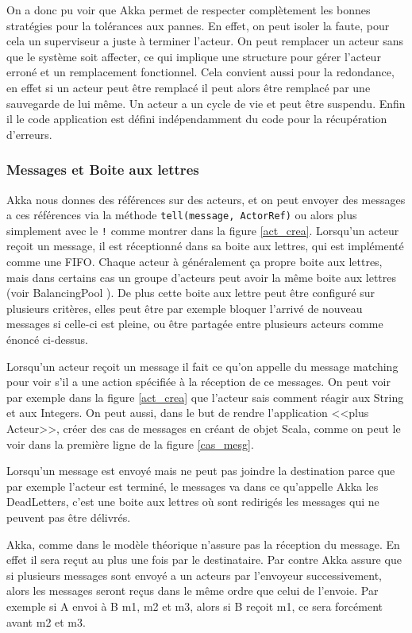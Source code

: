\documentclass[11pt, a4paper]{article}
\begin{document}
\newline
\par 
On a donc pu voir que Akka permet de respecter complètement les bonnes stratégies pour la tolérances aux pannes. En effet, on peut isoler la faute, pour cela un superviseur a juste à terminer l'acteur. On peut remplacer un acteur sans que le système soit affecter, ce qui implique une structure pour gérer l'acteur erroné et un remplacement fonctionnel. Cela convient aussi pour la redondance, en effet si un acteur peut être remplacé il peut alors être remplacé par une sauvegarde de lui même. Un acteur a un cycle de vie et peut être suspendu. Enfin il le code application est défini indépendamment du code pour la récupération d'erreurs.
\subsubsection{Messages et Boite aux lettres}
Akka nous donnes des références sur des acteurs, et on peut envoyer des messages a ces références via la méthode \texttt{tell(message, ActorRef)} ou alors plus simplement avec le \texttt{!} comme montrer dans la figure \ref{act_crea}. Lorsqu'un acteur reçoit un message, il est réceptionné dans sa boite aux lettres, qui est implémenté comme une FIFO. Chaque acteur à généralement ça propre boite aux lettres, mais dans certains cas un groupe d'acteurs peut avoir la même boite aux lettres (voir BalancingPool \cite{akka}). De plus cette boite aux lettre peut être configuré sur plusieurs critères, elles peut être par exemple bloquer l'arrivé de nouveau messages si celle-ci est pleine, ou être partagée entre plusieurs acteurs comme énoncé ci-dessus.
\par Lorsqu'un acteur reçoit un message il fait ce qu'on appelle du message matching pour voir s'il a une action spécifiée à la réception de ce messages. On peut voir par exemple dans la figure \ref{act_crea} que l'acteur sais comment réagir aux String et aux Integers. On peut aussi, dans le but de rendre l'application <<plus Acteur>>, créer des cas de messages en créant de objet Scala, comme on peut le voir dans la première ligne de la figure \ref{cas_mesg}.
\par Lorsqu'un message est envoyé mais ne peut pas joindre la destination parce que par exemple l'acteur est terminé, le messages va dans ce qu'appelle Akka les DeadLetters, c'est une boite aux lettres où sont redirigés les messages qui ne peuvent pas être délivrés.
\par Akka, comme dans le modèle théorique n'assure pas la réception du message. En effet il sera reçut au plus une fois par le destinataire. Par contre Akka assure que si plusieurs messages sont envoyé a un acteurs par l'envoyeur successivement, alors les messages seront reçus dans le même ordre que celui de l'envoie. Par exemple si A envoi à B m1, m2 et m3, alors si B reçoit m1, ce sera forcément avant m2 et m3.
\newline
\end{document}
